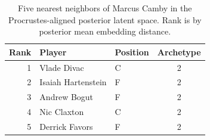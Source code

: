 \begin{table}[htbp]
  \centering\small
  \begin{tabular}{rllc}
    \toprule
    Rank & Player & Position & Archetype \\
    \midrule
    1 & Vlade Divac & C & 2 \\
    2 & Isaiah Hartenstein & F & 2 \\
    3 & Andrew Bogut & F & 2 \\
    4 & Nic Claxton & C & 2 \\
    5 & Derrick Favors & F & 2 \\
    \bottomrule
  \end{tabular}
  \caption{Five nearest neighbors of Marcus Camby in the Procrustes-aligned posterior latent space. Rank is by posterior mean embedding distance.}
\end{table}

